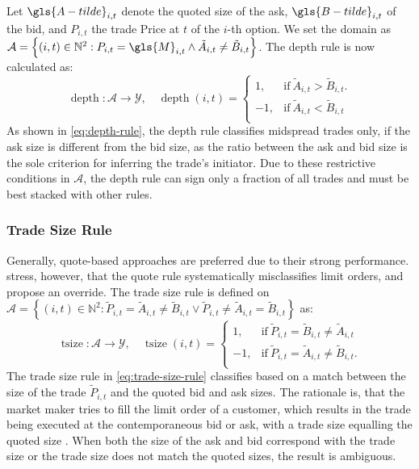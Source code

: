 Let $\gls{A-tilde}_{i,t}$ denote the quoted size of the ask, $\gls{B-tilde}_{i,t}$ of the bid, and $P_{i,t}$ the trade Price at $t$ of the $i$-th option. We set the domain as $\mathcal{A} = \left\{(i, t) \in \mathbb{N}^2: P_{i,t} = \gls{M}_{i,t} \land \tilde{A}_{i,t} \neq \tilde{B}_{i,t} \right\}$. The depth rule is now calculated as:
\begin{equation}
    \operatorname{depth} \colon \mathcal{A} \to \mathcal{Y},\quad
    \operatorname{depth}(i, t)=
    \begin{cases}
        1,  & \mathrm{if}\ \tilde{A}_{i,t} > \tilde{B}_{i,t}. \\
        -1, & \mathrm{if}\ \tilde{A}_{i,t} < \tilde{B}_{i,t}\\
    \end{cases}
    \label{eq:depth-rule}
\end{equation}
As shown in \cref{eq:depth-rule}, the depth rule classifies midspread trades only, if the ask size is different from the bid size, as the ratio between the ask and bid size is the sole criterion for inferring the trade's initiator. Due to these restrictive conditions in $\mathcal{A}$, the depth rule can sign only a fraction of all trades and must be best stacked with other rules.

\subsubsection{Trade Size Rule}\label{sec:trade-size-rule}

Generally, quote-based approaches are preferred due to their strong performance. \textcite[][13]{grauerOptionTradeClassification2022} stress, however, that the quote rule systematically misclassifies limit orders, and propose an override. The trade size rule is defined on $\mathcal{A} = \left\{(i, t) \in \mathbb{N}^2: \tilde{P}_{i,t} = \tilde{A}_{i,t} \neq \tilde{B}_{i,t} \lor \tilde{P}_{i,t} \neq\tilde{A}_{i,t} = \tilde{B}_{i,t} \right\}$ as:
\begin{equation}
    \operatorname{tsize} \colon \mathcal{A} \to \mathcal{Y},\quad
    \operatorname{tsize}(i, t)=
    \begin{cases}
        1,  & \mathrm{if}\ \tilde{P}_{i, t} = \tilde{B}_{i, t} \neq \tilde{A}_{i, t}  \\
        -1, & \mathrm{if}\ \tilde{P}_{i, t} = \tilde{A}_{i, t} \neq \tilde{B}_{i, t}. \\
    \end{cases}
    \label{eq:trade-size-rule}
\end{equation}
The trade size rule in \cref{eq:trade-size-rule} classifies based on a match between the size of the trade $\tilde{P}_{i, t}$ and the quoted bid and ask sizes. The rationale is, that the market maker tries to fill the limit order of a customer, which results in the trade being executed at the contemporaneous bid or ask, with a trade size equalling the quoted size \autocite[][13]{grauerOptionTradeClassification2022}. When both the size of the ask and bid correspond with the trade size or the trade size does not match the quoted sizes, the result is ambiguous.

